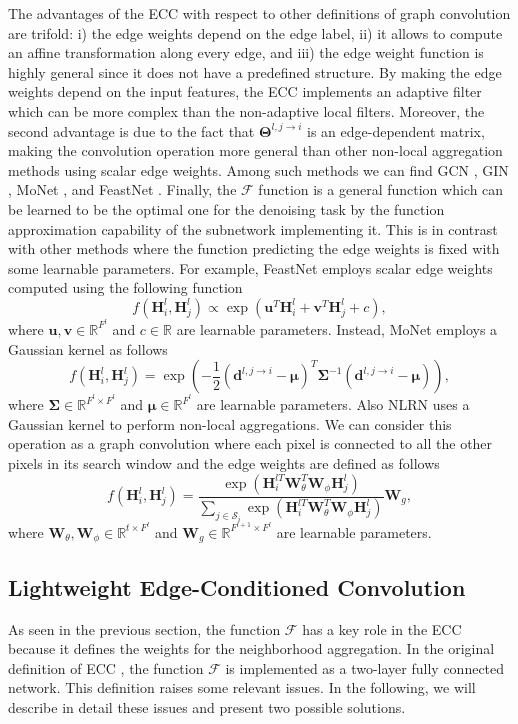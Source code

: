 \documentclass[journal]{IEEEtran}
\newcommand{\Hb}{\mathbf{H}}
\newcommand{\Wb}{\mathbf{W}}
\newcommand{\fun}{\mathcal{F}}
\newcommand{\RR}{\mathbb{R}}
\begin{document}
The advantages of the ECC with respect to other definitions of graph convolution are trifold: i) the edge weights depend on the edge label, ii) it allows to compute an affine transformation along every edge, and iii) the edge weight function is highly general since it does not have a predefined structure. By making the edge weights depend on the input features, the ECC implements an adaptive filter which can be more complex than the non-adaptive local filters. Moreover, the second advantage is due to the fact that $\bm{\Theta}^{l,j\to i}$ is an edge-dependent matrix, making the convolution operation more general than other non-local aggregation methods using scalar edge weights. Among such methods we can find GCN \cite{kipf2016semi}, GIN \cite{xu2018powerful}, MoNet \cite{monti2017geometric}, and FeastNet \cite{verma2018feastnet}.  Finally, the $\fun$ function is a general function which can be learned to be the optimal one for the denoising task by the function approximation capability of the subnetwork implementing it. This is in contrast with other methods where the function predicting the edge weights is fixed with some learnable parameters. For example, FeastNet \cite{verma2018feastnet} employs scalar edge weights computed using the following function
\[
f(\Hb_i^{l},\Hb_j^{l})\propto \exp \left(\mathbf{u}^T\Hb_i^{l}+\mathbf{v}^T\Hb_j^{l}+c\right),
\]
where $\mathbf{u},\mathbf{v}\in\RR^{F^l}$ and $c\in\RR$ are learnable parameters. Instead, MoNet \cite{monti2017geometric} employs a Gaussian kernel as follows
\[
f(\Hb_i^{l},\Hb_j^{l})=\exp\left(-\frac{1}{2} (\mathbf{d}^{l,j\to i}-\bm{\mu})^T\bm{\Sigma}^{-1}(\mathbf{d}^{l,j\to i}-\bm{\mu})\right),
\]
where $\bm{\Sigma}\in\RR^{F^l\times F^l}$ and $\bm{\mu}\in\RR^{F^l}$ are learnable parameters. Also NLRN \cite{liu2018non} uses a Gaussian kernel to perform non-local aggregations. We can consider this operation as a graph convolution where each pixel is connected to all the other pixels in its search window and the edge weights are defined as follows
\[
f(\Hb_i^{l},\Hb_j^{l})=\frac{\exp\left(\Hb_i^{lT}\Wb_{\theta}^T\Wb_{\phi}\Hb_j^{l}\right)}{\sum_{j\in\mathcal{S}_i}\exp\left(\Hb_i^{lT}\Wb_{\theta}^T\Wb_{\phi}\Hb_j^{l}\right)}\Wb_g,
\]
where $\Wb_{\theta},\Wb_{\phi}\in\RR^{t\times F^l}$ and $\Wb_g\in\RR^{F^{l+1}\times F^{l}}$ are learnable parameters.


\subsection{Lightweight Edge-Conditioned Convolution} \label{sec:ecc}
As seen in the previous section, the function $\fun$ has a key role in the ECC because it defines the weights for the neighborhood aggregation. In the original definition of ECC \cite{simonovsky2017dynamic}, the function $\fun$ is implemented as a two-layer fully connected network. This definition raises some relevant issues. In the following, we will describe in detail these issues and present two possible solutions.
\end{document}
